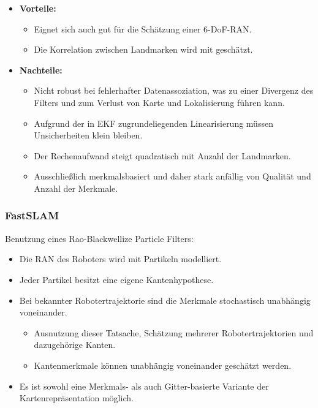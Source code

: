 \documentclass[a4paper, 11pt, accentcolor = tud3b]{tudreport}
\begin{document}
					\begin{itemize}
						\item \textbf{Vorteile:}
							\begin{itemize}
								\item Eignet sich auch gut für die Schätzung einer 6-DoF-RAN.
								\item Die Korrelation zwischen Landmarken wird mit geschätzt.
							\end{itemize}
						\item \textbf{Nachteile:}
							\begin{itemize}
								\item Nicht robust bei fehlerhafter Datenassoziation, was zu einer Divergenz des Filters und zum Verlust von Karte und Lokalisierung führen kann.
								\item Aufgrund der in EKF zugrundeliegenden Linearisierung müssen Unsicherheiten klein bleiben.
								\item Der Rechenaufwand steigt quadratisch mit Anzahl der Landmarken.
								\item Ausschließlich merkmalsbasiert und daher stark anfällig von Qualität und Anzahl der Merkmale.
							\end{itemize}
					\end{itemize}

				\subsubsection{FastSLAM}
					Benutzung eines Rao-Blackwellize Particle Filters:
					\begin{itemize}
						\item Die RAN des Roboters wird mit Partikeln modelliert.
						\item Jeder Partikel besitzt eine eigene Kantenhypothese.
						\item Bei bekannter Robotertrajektorie sind die Merkmale stochastisch unabhängig voneinander.
							\begin{itemize}
								\item Ausnutzung dieser Tatsache, Schätzung mehrerer Robotertrajektorien und dazugehörige Kanten.
								\item Kantenmerkmale können unabhängig voneinander geschätzt werden.
							\end{itemize}
						\item Es ist sowohl eine Merkmals- als auch Gitter-basierte Variante der Kartenrepräsentation möglich.
					\end{itemize}
				
\end{document}
